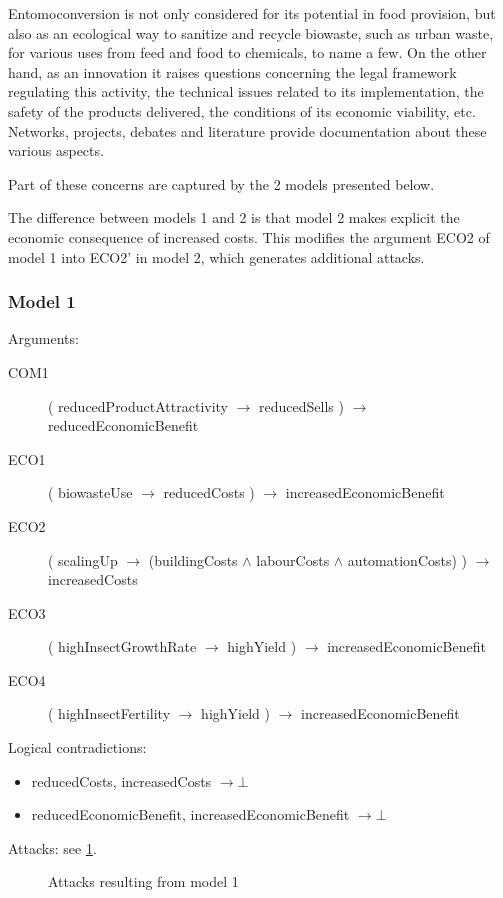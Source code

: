 \documentclass[version=3.21, pagesize, twoside=off, bibliography=totoc, DIV=calc, fontsize=12pt, a4paper, french, english]{scrartcl}
\begin{document}
Entomoconversion is not only considered for its potential in food provision, but also as an ecological way to sanitize and recycle biowaste, such as urban waste, for various uses from feed and food to chemicals, to name a few. On the other hand, as an innovation it raises questions concerning the legal framework regulating this activity, the technical issues related to its implementation, the safety of the products delivered, the conditions of its economic viability, etc. Networks, projects, debates and literature provide documentation about these various aspects.

Part of these concerns are captured by the 2 models presented below.

The difference between models 1 and 2 is that model 2 makes explicit the economic consequence of increased costs. This modifies the argument ECO2 of model 1 into ECO2’ in model 2, which generates additional attacks.

\subsubsection{Model 1}
Arguments:
\begin{description}
	\item[COM1] ( reducedProductAttractivity $→$ reducedSells )  $→$  reducedEconomicBenefit
	\item[ECO1] ( biowasteUse $→$ reducedCosts )  $→$  increasedEconomicBenefit
	\item[ECO2] ( scalingUp $→$ (buildingCosts $\land$ labourCosts $\land$ automationCosts) )  $→$  increasedCosts
	\item[ECO3] ( highInsectGrowthRate $→$ highYield )  $→$  increasedEconomicBenefit
	\item[ECO4] ( highInsectFertility $→$ highYield )  $→$  increasedEconomicBenefit
\end{description}

Logical contradictions:
\begin{itemize}
	\item reducedCosts, increasedCosts $→ ⊥$
	\item reducedEconomicBenefit, increasedEconomicBenefit $→ ⊥$
\end{itemize}

Attacks: see \cref{fig:m1}.
\begin{figure}
	\caption{Attacks resulting from model 1}
	\label{fig:m1}
\end{figure}
\end{document}
